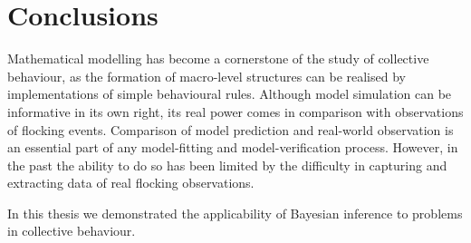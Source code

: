 \chapter*{Conclusions}

Mathematical modelling has become a cornerstone of the study of collective
behaviour, as the formation of macro-level structures can be realised by
implementations of simple behavioural rules. Although model simulation can be
informative in its own right, its real power comes in comparison with
observations of flocking events. Comparison of model prediction and real-world
observation is an essential part of any model-fitting and model-verification
process. However, in the past the ability to do so has been limited by the
difficulty in capturing and extracting data of real flocking observations.

In this thesis we demonstrated the applicability of Bayesian inference to
problems in collective behaviour. 


